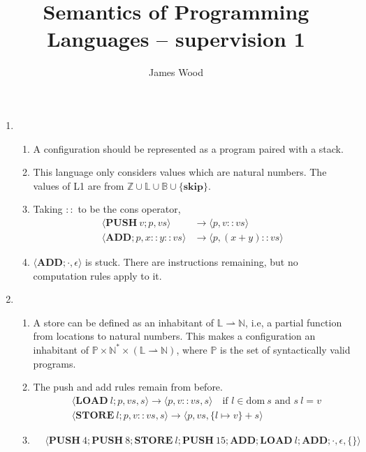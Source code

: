 \documentclass{article}
\begin{document}
\title{Semantics of Programming Languages -- supervision 1}
\author{James Wood}
\maketitle

\begin{enumerate}
\item
  \begin{enumerate}
  \item A configuration should be represented as a program paired with a stack.
  \item This language only considers values which are natural numbers. The values of L1 are from $\mathbb Z\cup\mathbb L\cup\mathbb B\cup\{\mathbf{skip}\}$.
  \item Taking $::$ to be the cons operator,
    \begin{align}
      \tag{push} \langle \mathbf{PUSH}~v;p, vs \rangle &\to \langle p, v :: vs \rangle \\
      \tag{add} \langle \mathbf{ADD};p, x :: y :: vs \rangle &\to \langle p, (x + y) :: vs \rangle
    \end{align}
  \item $\langle \mathbf{ADD};\cdot, \epsilon \rangle$ is stuck. There are instructions remaining, but no computation rules apply to it.
  \end{enumerate}
\item
  \begin{enumerate}
  \item A store can be defined as an inhabitant of $\mathbb L \rightharpoonup \mathbb N$, i.e, a partial function from locations to natural numbers. This makes a configuration an inhabitant of $\mathbb P \times \mathbb N^* \times (\mathbb L \rightharpoonup \mathbb N)$, where $\mathbb P$ is the set of syntactically valid programs.
  \item The push and add rules remain from before.
    \begin{align}
      & \tag{load} \langle \mathbf{LOAD}~l;p, vs, s \rangle \to \langle p, v :: vs, s \rangle \quad \textrm{if }l \in \mathrm{dom}~s\textrm{ and }s~l = v \\
      & \tag{store} \langle \mathbf{STORE}~l;p, v :: vs, s \rangle \to \langle p, vs, \{l \mapsto v\} + s \rangle
    \end{align}
  \item
    \begin{align*}
                & \langle \mathbf{PUSH}~4;\mathbf{PUSH}~8;\mathbf{STORE}~l;\mathbf{PUSH}~15;\mathbf{ADD};\mathbf{LOAD}~l;\mathbf{ADD};\cdot, \epsilon, \{\} \rangle

\end{align*}
\end{enumerate}
\end{enumerate}
\end{document}
